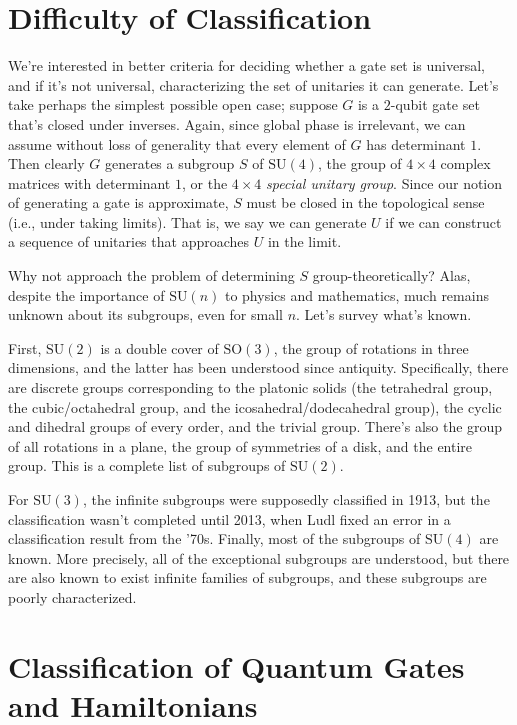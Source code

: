 \documentclass[11pt]{report}
\theoremstyle{plain}
\theoremstyle{definition}
\begin{document}
\section{Difficulty of Classification}

We're interested in better criteria for deciding whether a gate set is universal, and if it's not universal, characterizing the set of unitaries it can generate. Let's take perhaps the simplest possible open case; suppose $G$ is a $2$-qubit gate set that's closed under inverses.  Again, since global phase is irrelevant, we can assume without loss of generality that every element of $G$ has determinant $1$.  Then clearly $G$ generates a subgroup $S$ of $\mathrm{SU}(4)$, the group of $4 \times 4$ complex matrices with determinant $1$, or the $4\times 4$ \emph{special unitary group}. Since our notion of generating a gate is approximate, $S$ must be closed in the topological sense (i.e., under taking limits). That is, we say we can generate $U$ if we can construct a sequence of unitaries that approaches $U$ in the limit.

Why not approach the problem of determining $S$ group-theoretically?  Alas, despite the importance of $\mathrm{SU}(n)$ to physics and mathematics, much remains unknown about its subgroups, even for small $n$. Let's survey what's known.

First, $\mathrm{SU}(2)$ is a double cover of $\mathrm{SO}(3)$, the group of rotations in three dimensions, and the latter has been understood since antiquity. Specifically, there are discrete groups corresponding to the platonic solids (the tetrahedral group, the cubic/octahedral group, and the icosahedral/dodecahedral group), the cyclic and dihedral groups of every order, and the trivial group. There's also the group of all rotations in a plane, the group of symmetries of a disk, and the entire group. This is a complete list of subgroups of $\mathrm{SU}(2)$.

For $\mathrm{SU}(3)$, the infinite subgroups were supposedly classified in 1913, but the classification wasn't completed until 2013, when Ludl fixed an error in a classification result from the '70s. Finally, most of the subgroups of $\mathrm{SU}(4)$ are known. More precisely, all of the exceptional subgroups are understood, but there are also known to exist infinite families of subgroups, and these subgroups are poorly characterized.

\section{Classification of Quantum Gates and Hamiltonians}
\end{document}
